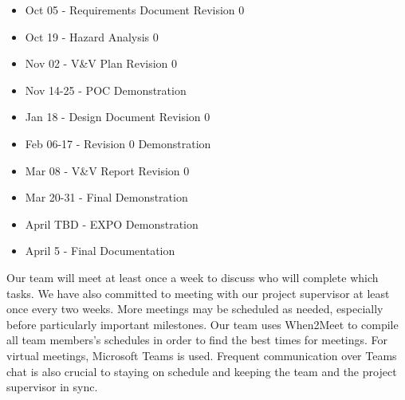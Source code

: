 \documentclass{article}
\begin{document}
\begin{itemize}
  \item Oct 05 - Requirements Document Revision 0
  \item Oct 19 - Hazard Analysis 0 
  \item Nov 02 - V\&V Plan Revision 0
  \item Nov 14-25 - POC Demonstration
  \item Jan 18 - Design Document Revision 0
  \item Feb 06-17 - Revision 0 Demonstration
  \item Mar 08 - V\&V Report Revision 0
  \item Mar 20-31 - Final Demonstration
  \item April TBD - EXPO Demonstration
  \item April 5 - Final Documentation \\
\end{itemize}
\noindent Our team will meet at least once a week to discuss who will complete which tasks. We have also committed to meeting with our project supervisor at least once every two weeks. More meetings may be scheduled as needed, especially before particularly important milestones. Our team uses When2Meet to compile all team members's schedules in order to find the best times for meetings. For virtual meetings, Microsoft Teams is used. Frequent communication over Teams chat is also crucial to staying on schedule and keeping the team and the project supervisor in sync. \\
\end{document}
